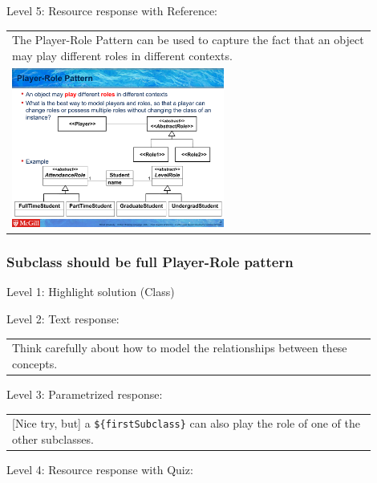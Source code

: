 \noindent Level 5: Resource response with Reference: \medskip

\begin{tabular}{|p{0.9\linewidth}}
The Player-Role Pattern can be used to capture the fact that an object may play different roles
in different contexts.

\\
\includegraphics[width=0.6\textwidth]{images/player_role.png}
\end{tabular} \medskip


\subsubsection{Subclass should be full Player-Role pattern}

\noindent Level 1: Highlight solution (Class) \medskip

\noindent Level 2: Text response: \medskip

\begin{tabular}{|p{0.9\linewidth}}
Think carefully about how to model the relationships between these concepts.
\end{tabular} \medskip

\noindent Level 3: Parametrized response: \medskip

\begin{tabular}{|p{0.9\linewidth}}
[Nice try, but] a \verb|${firstSubclass}| can also play the role of one of the other subclasses.
\end{tabular} \medskip

\noindent Level 4: Resource response with Quiz: \medskip


